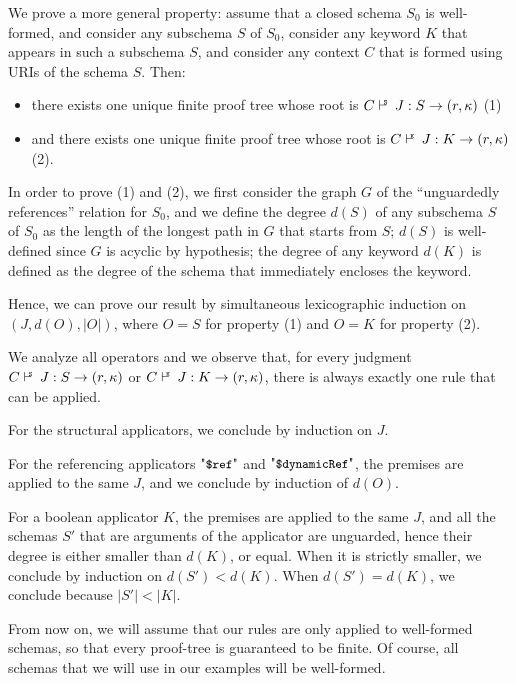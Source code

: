 \begin{appendixproof}
We prove a more general property:
assume that a closed schema $S_0$ is well-formed, and consider any subschema $S$ of $S_0$, consider
any keyword $K$ that appears in such a subschema $S$, and consider any context $C$ that is formed using URIs of the schema $S$.
Then:
\begin{itemize}
\item there exists one unique finite proof tree whose root is 
$\SJudg{C}{J}{S}\Ret{r}(r,\ps)$ (1)
\item and there exists one unique finite proof tree whose root is 
$\KJudg{C}{J}{K}\Ret{r}(r,\ps)$ (2).
\end{itemize}

In order to prove (1) and (2), we first consider the graph $G$ of the ``unguardedly references'' relation for $S_0$,
and we define the degree $d(S)$ of any subschema $S$ of $S_0$ as the length of the longest
path in $G$ that starts from $S$; $d(S)$ is well-defined since $G$ is acyclic by hypothesis;
the degree of any keyword $d(K)$ is defined as the
degree of the schema that immediately encloses the keyword.

Hence, we can prove our result by simultaneous lexicographic induction on $(J, d(O),|O|)$,
where $O = S$ for property (1) and $O = K$ for property (2). 

We analyze all operators and we observe that, for every judgment $\SJudg{C}{J}{S}\Ret{r}(r,\ps)$
or $\KJudg{C}{J}{K}\Ret{r}(r,\ps)$, there is always exactly one rule that can be applied.

For the structural applicators, we conclude by induction on $J$.

For the referencing applicators $\qdref$ and $\qddref$, the premises are applied to the same $J$, and we conclude by induction of $d(O)$.

For a boolean applicator $K$, the premises are applied to the same $J$, and all the schemas $S'$ that are arguments of the applicator
are unguarded, hence their degree is either smaller than $d(K)$, or equal. When it is strictly smaller, we conclude by induction
on $d(S')<d(K)$. When $d(S')=d(K)$, we conclude because $|S'| < |K|$.
\end{appendixproof}

From now on, we will assume that our rules are only applied to well-formed schemas, so that every proof-tree is guaranteed to be finite.
Of course, all schemas that we will use in our examples will be well-formed.

